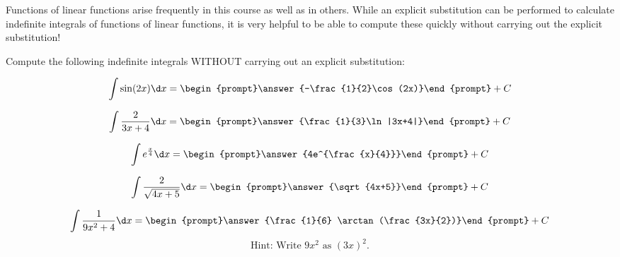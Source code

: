 \documentclass{ximera}
\author{Jim Talamo}
\begin{document}
\begin{exercise}

Functions of linear functions arise frequently in this course as well as in others.  While an explicit substitution can be performed to calculate indefinite integrals of functions of linear functions, it is very helpful to be able to compute these quickly without carrying out the explicit substitution!  

Compute the following indefinite integrals WITHOUT carrying out an explicit substitution:


\[\int \sin(2x) \d x = \begin{prompt}\answer{-\frac{1}{2}\cos(2x)}\end{prompt}+C\]

\[\int \frac{2}{3x+4} \d x = \begin{prompt}\answer{\frac{1}{3}\ln|3x+4|}\end{prompt}+C\]

\[\int e^{\frac{x}{4}} \d x = \begin{prompt}\answer{4e^{\frac{x}{4}}}\end{prompt}+C\]

\[\int \frac{2}{\sqrt{4x+5}} \d x = \begin{prompt}\answer{\sqrt{4x+5}}\end{prompt}+C\]

\[\int \frac{1}{9x^2+4} \d x = \begin{prompt}\answer{\frac{1}{6} \arctan(\frac{3x}{2})}\end{prompt}+C\]
\[\mbox{Hint: Write $9x^2$ as $(3x)^2$.}\]





\end{exercise}
\end{document}
